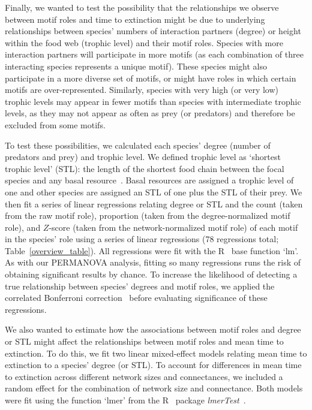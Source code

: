 \documentclass[12pt]{article}
\begin{document}
			Finally, we wanted to test the possibility that the relationships we observe between motif roles and time to extinction might be due to underlying relationships between species' numbers of interaction partners (degree) or height within the food web (trophic level) and their motif roles.
			Species with more interaction partners will participate in more motifs (as each combination of three interacting species represents a unique motif).
			These species might also participate in a more diverse set of motifs, or might have roles in which certain motifs are over-represented.
			Similarly, species with very high (or very low) trophic levels may appear in fewer motifs than species with intermediate trophic levels, as they may not appear as often as prey (or predators) and therefore be excluded from some motifs.
			
			
			To test these possibilities, we calculated each species' degree (number of predators and prey) and trophic level. We defined trophic level as `shortest trophic level' (STL): the length of the shortest food chain between the focal species and any basal resource~\citep{Hairston1993}. Basal resources are assigned a trophic level of one and other species are assigned an STL of one plus the STL of their prey.
			We then fit a series of linear regressions relating degree or STL and the count (taken from the raw motif role), proportion (taken from the degree-normalized motif role), and $Z$-score (taken from the network-normalized motif role) of each motif in the species' role using a series of linear regressions (78 regressions total; Table~\ref{overview_table}).
			All regressions were fit with the R~\citep{R} base function `lm'.
        	As with our PERMANOVA analysis, fitting so many regressions runs the risk of obtaining significant results by chance.
			To increase the likelihood of detecting a true relationship between species' degrees and motif roles, we applied the correlated Bonferroni correction~\citep{Drezner2016} before evaluating significance of these regressions.


            We also wanted to estimate how the associations between motif roles and degree or STL might affect the relationships between motif roles and mean time to extinction.
            To do this, we fit two linear mixed-effect models relating mean time to extinction to a species' degree (or STL). 
            To account for differences in mean time to extinction across different network sizes and connectances, we included a random effect for the combination of network size and connectance. 
            Both models were fit using the function `lmer' from the R~\citep{R} package \emph{lmerTest}~\citep{lmerTest}.
\end{document}

